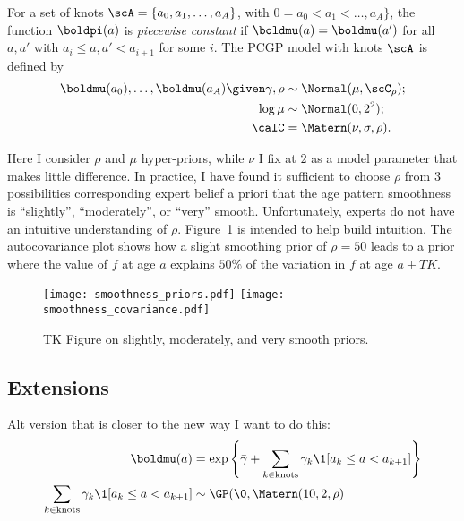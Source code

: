 For a set of knots $\scA = \{a_0, a_1, \ldots, a_A\}$, with $0 = a_0 < a_1 <
\ldots , a_A\}$, the function $\boldpi(a)$ is \emph{piecewise
  constant} if $\boldmu(a) = \boldmu(a')$ for all $a, a'$ with $a_i
\leq a, a' < a_{i+1}$ for some $i$.  The PCGP model with knots $\scA$
is defined by
\begin{align*}
\boldmu(a_0), \ldots, \boldmu(a_A) \given \gamma, \rho &\sim \Normal(\mu, \scC_\rho);\\
\log \mu &\sim \Normal(0, 2^2);\\
\calC &= \Matern(\nu, \sigma, \rho).\\
\end{align*}

Here I consider $\rho$ and $\mu$ hyper-priors, while $\nu$ I fix at
$2$ as a model parameter that makes little difference.  In practice, I
have found it sufficient to choose $\rho$ from $3$ possibilities corresponding
expert belief a priori that the age pattern smoothness is ``slightly'',
``moderately'', or ``very'' smooth.
Unfortunately, experts do not have an intuitive understanding of
$\rho$. Figure~\ref{theory-age_pattern_model-smoothness_priors} is
intended to help build intuition. The autocovariance plot shows how a
slight smoothing prior of $\rho=50$ leads to a prior where the value
of $f$ at age $a$ explains $50\%$ of the variation in $f$ at age
$a+TK$.  

\begin{figure}[h]
\begin{center}
\texttt{[image: smoothness\_priors.pdf]}
\texttt{[image: smoothness\_covariance.pdf]}
\end{center}
\caption{TK Figure on slightly, moderately, and very smooth priors.}
\label{theory-age_pattern_model-smoothness_priors}
\end{figure}
\subsection{Extensions}

Alt version that is closer to the new way I want to do this:
\begin{align*}
\boldmu(a) &= \exp\left\{ \bar{\gamma} + \sum_{k\in\text{knots}} \gamma_k \1[a_k \leq a < a_{k+1}] \right\}\\
\sum_{k\in\text{knots}} \gamma_k \1[a_k \leq a < a_{k+1}] &\sim \GP(\0, \Matern(10, 2, \rho)\\
\end{align*}

